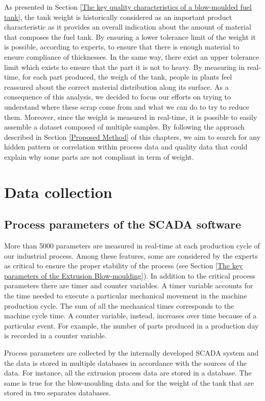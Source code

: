 As presented in Section \ref{The key quality characteristics of a blow-moulded fuel tank}, the tank weight is historically considered as an important product characteristic as it provides an overall indication about the amount of material that composes the fuel tank. By ensuring a lower tolerance limit of the weight it is possible, according to experts, to ensure that there is enough material to ensure compliance of thicknesses. In the same way, there exist an upper tolerance limit which exists to ensure that the part it is not to heavy. By measuring in real-time, for each part produced, the weigh of the tank, people in plants feel reassured about the correct material distribution along its surface.  
As a consequence of this analysis, we decided to focus our efforts on trying to understand where these scrap come from and what we can do to try to reduce them. Moreover, since the weight is measured in real-time, it is possible to easily assemble a dataset composed of multiple samples. By following the approach described in Section \ref{Proposed Method} of this chapters, we aim to search for any hidden pattern or correlation within process data and quality data that could explain why some parts are not compliant in term of weight.


\section{Data collection}

\subsection{Process parameters of the SCADA software}

More than 5000 parameters are measured in real-time at each production cycle of our industrial process. Among these features, some are considered by the experts as critical to ensure the proper stability of the process (see Section \ref{The key parameters of the Extrusion Blow-moulding}). In addition to the critical process parameters there are timer and counter variables. A timer variable accounts for the time needed to execute a particular mechanical movement in the machine production cycle. The sum of all the mechanical times corresponds to the machine cycle time. A counter variable, instead, increases over time because of a particular event. For example, the number of parts produced in a production day is recorded in a counter variable.  

Process parameters are collected by the internally developed SCADA system and the data is stored in multiple databases in accordance with the sources of the data. For instance, all the extrusion process data are stored in a database. The same is true for the blow-moulding data and for the weight of the tank that are stored in two separates databases. 

